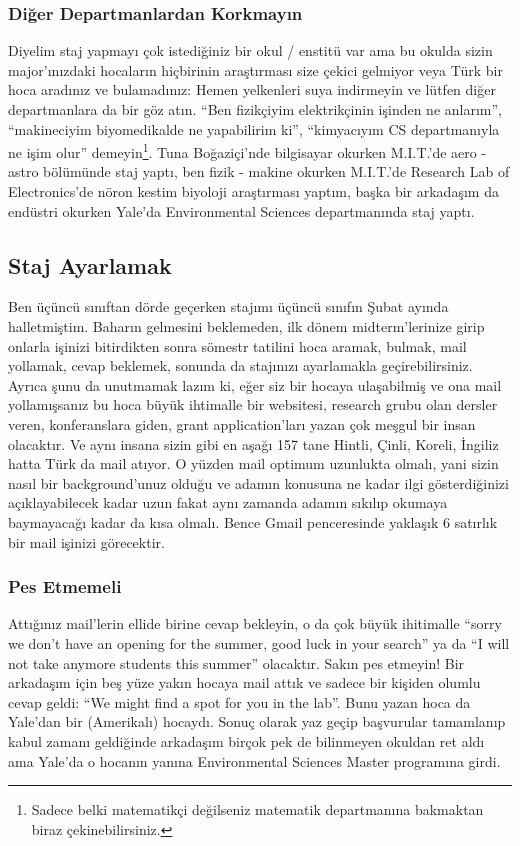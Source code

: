 \documentclass[12pt]{article}
\theoremstyle{break}
\begin{document}
\subsubsection{Diğer Departmanlardan Korkmayın}
Diyelim staj yapmayı çok istediğiniz bir okul / enstitü var ama bu okulda sizin major’ınızdaki hocaların hiçbirinin araştırması size çekici gelmiyor veya Türk bir hoca aradınız ve bulamadınız: Hemen yelkenleri suya indirmeyin ve lütfen diğer departmanlara da bir göz atın. “Ben fizikçiyim elektrikçinin işinden ne anlarım”, “makineciyim biyomedikalde ne yapabilirim ki”, “kimyacıyım CS departmanıyla ne işim olur” demeyin\footnote{Sadece belki matematikçi değilseniz matematik departmanına bakmaktan biraz çekinebilirsiniz.}. Tuna Boğaziçi’nde bilgisayar okurken M.I.T.’de aero - astro bölümünde staj yaptı, ben fizik - makine okurken M.I.T.’de Research Lab of Electronics’de nöron kestim biyoloji araştırması yaptım, başka bir arkadaşım da endüstri okurken Yale’da Environmental Sciences departmanında staj yaptı.

\subsection{Staj Ayarlamak}
Ben üçüncü sınıftan dörde geçerken stajımı üçüncü sınıfın Şubat ayında halletmiştim. Baharın gelmesini beklemeden, ilk dönem midterm’lerinize girip onlarla işinizi bitirdikten sonra sömestr tatilini hoca aramak, bulmak, mail yollamak, cevap beklemek, sonunda da stajınızı ayarlamakla geçirebilirsiniz. Ayrıca şunu da unutmamak lazım ki, eğer siz bir hocaya ulaşabilmiş ve ona mail yollamışsanız bu hoca büyük ihtimalle bir websitesi, research grubu olan dersler veren, konferanslara giden, grant application’ları yazan çok meşgul bir insan olacaktır. Ve aynı insana sizin gibi en aşağı 157 tane Hintli, Çinli, Koreli, İngiliz hatta Türk da mail atıyor. O yüzden mail optimum uzunlukta olmalı, yani sizin nasıl bir background’unuz olduğu ve adamın konusuna ne kadar ilgi gösterdiğinizi açıklayabilecek kadar uzun fakat aynı zamanda adamın sıkılıp okumaya baymayacağı kadar da kısa olmalı. Bence Gmail penceresinde yaklaşık 6 satırlık bir mail işinizi görecektir.


\subsubsection{Pes Etmemeli}
Attığınız mail’lerin ellide birine cevap bekleyin, o da çok büyük ihitimalle ``sorry we don’t have an opening for the summer, good luck in your search'' ya da ``I will not take anymore students this summer'' olacaktır. Sakın pes etmeyin! Bir arkadaşım için beş yüze yakın hocaya mail attık ve sadece bir kişiden olumlu cevap geldi: “We might find a spot for you in the lab''. Bunu yazan hoca da Yale’dan bir (Amerikalı) hocaydı. Sonuç olarak yaz geçip başvurular tamamlanıp kabul zamanı geldiğinde arkadaşım birçok pek de bilinmeyen okuldan ret aldı ama Yale’da o hocanın yanına Environmental Sciences Master programına girdi.
\end{document}
